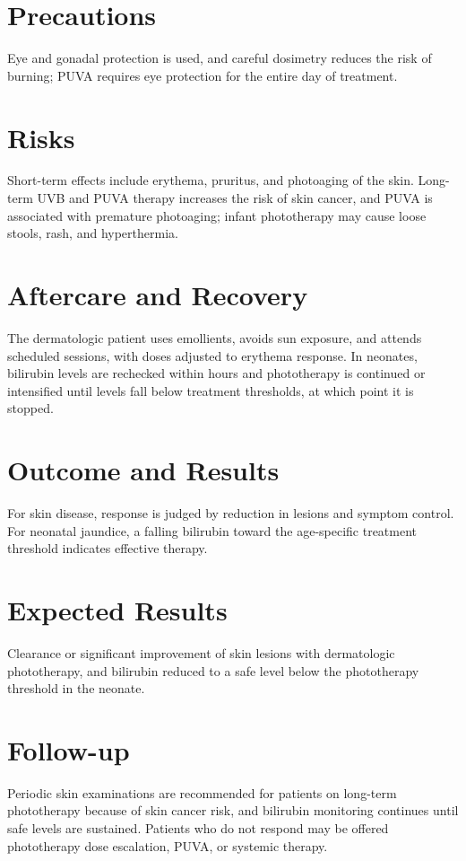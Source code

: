 \section*{Precautions}
Eye and gonadal protection is used, and careful dosimetry reduces the risk of burning; PUVA requires eye protection for the entire day of treatment.

\section*{Risks}
Short-term effects include erythema, pruritus, and photoaging of the skin. Long-term UVB and PUVA therapy increases the risk of skin cancer, and PUVA is associated with premature photoaging; infant phototherapy may cause loose stools, rash, and hyperthermia.

\section*{Aftercare and Recovery}
The dermatologic patient uses emollients, avoids sun exposure, and attends scheduled sessions, with doses adjusted to erythema response. In neonates, bilirubin levels are rechecked within hours and phototherapy is continued or intensified until levels fall below treatment thresholds, at which point it is stopped.

\section*{Outcome and Results}
For skin disease, response is judged by reduction in lesions and symptom control. For neonatal jaundice, a falling bilirubin toward the age-specific treatment threshold indicates effective therapy.

\section*{Expected Results}
Clearance or significant improvement of skin lesions with dermatologic phototherapy, and bilirubin reduced to a safe level below the phototherapy threshold in the neonate.

\section*{Follow-up}
Periodic skin examinations are recommended for patients on long-term phototherapy because of skin cancer risk, and bilirubin monitoring continues until safe levels are sustained. Patients who do not respond may be offered phototherapy dose escalation, PUVA, or systemic therapy.


